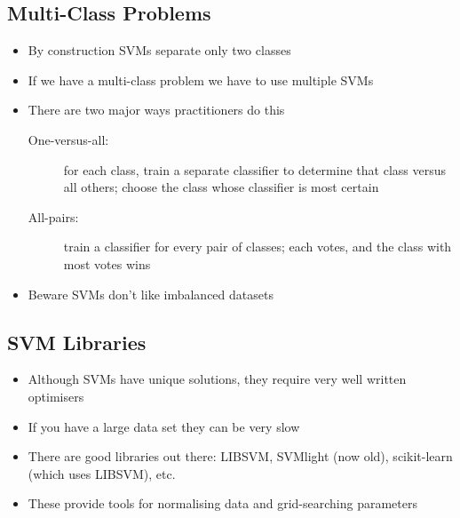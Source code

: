 
\begin{slide}
\section[-2]{Multi-Class Problems}

\begin{PauseHighLight}
  \begin{itemize}
  \item By construction SVMs separate only two classes\pause
  \item If we have a multi-class problem we have to use multiple
    SVMs\pause
  \item There are two major ways practitioners do this
    \begin{description}
    \item[One-versus-all:] for each class, train a separate classifier to
      determine that class versus all others; choose the class whose
      classifier is most certain\pause
    \item[All-pairs:] train a classifier for every pair of classes;
      each votes, and the class with most votes wins\pause
    \end{description}
  \item Beware SVMs don't like imbalanced datasets\pause
  \end{itemize}
\end{PauseHighLight}

\end{slide}



\begin{slide}
\section{SVM Libraries}

\begin{PauseHighLight}
  \begin{itemize}
  \item Although SVMs have unique solutions, they require very well
    written optimisers\pause
  \item If you have a large data set they can be very slow\pause
  \item There are good libraries out there: LIBSVM, SVMlight (now old),
    scikit-learn (which uses LIBSVM), etc.\pause
  \item These provide tools for normalising data and grid-searching
    parameters\pause
  \end{itemize}
\end{PauseHighLight}

\end{slide}




